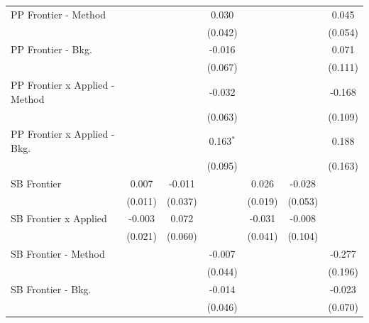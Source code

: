 \begin{tabular}{lcccccc}
   PP Frontier - Method           &               &               & 0.030         &              &               & 0.045\\   
                                  &               &               & (0.042)       &              &               & (0.054)\\   
   PP Frontier - Bkg.             &               &               & -0.016        &              &               & 0.071\\   
                                  &               &               & (0.067)       &              &               & (0.111)\\   
   PP Frontier x Applied - Method &               &               & -0.032        &              &               & -0.168\\   
                                  &               &               & (0.063)       &              &               & (0.109)\\   
   PP Frontier x Applied - Bkg.   &               &               & 0.163$^{*}$   &              &               & 0.188\\   
                                  &               &               & (0.095)       &              &               & (0.163)\\   
   SB Frontier                    & 0.007         & -0.011        &               & 0.026        & -0.028        &   \\   
                                  & (0.011)       & (0.037)       &               & (0.019)      & (0.053)       &   \\   
   SB Frontier x Applied          & -0.003        & 0.072         &               & -0.031       & -0.008        &   \\   
                                  & (0.021)       & (0.060)       &               & (0.041)      & (0.104)       &   \\   
   SB Frontier - Method           &               &               & -0.007        &              &               & -0.277\\   
                                  &               &               & (0.044)       &              &               & (0.196)\\   
   SB Frontier - Bkg.             &               &               & -0.014        &              &               & -0.023\\   
                                  &               &               & (0.046)       &              &               & (0.070)\\   

\end{tabular}
